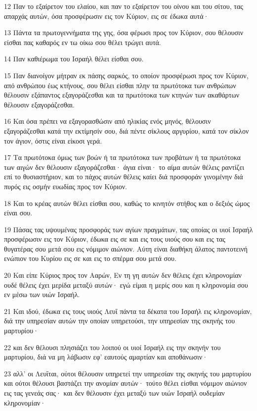 \par 12 Παν το εξαίρετον του ελαίου, και παν το εξαίρετον του οίνου και του σίτου, τας απαρχάς αυτών, όσα προσφέρωσιν εις τον Κύριον, εις σε έδωκα αυτά·
\par 13 Πάντα τα πρωτογεννήματα της γης, όσα φέρωσι προς τον Κύριον, σου θέλουσιν είσθαι πας καθαρός εν τω οίκω σου θέλει τρώγει αυτά.
\par 14 Παν καθιέρωμα του Ισραήλ θέλει είσθαι σου.
\par 15 Παν διανοίγον μήτραν εκ πάσης σαρκός, το οποίον προσφέρωσι προς τον Κύριον, από ανθρώπου έως κτήνους, σου θέλει είσθαι πλην τα πρωτότοκα των ανθρώπων θέλουσιν εξάπαντος εξαγοράζεσθαι και τα πρωτότοκα των κτηνών των ακαθάρτων θέλουσιν εξαγοράζεσθαι.
\par 16 Και όσα πρέπει να εξαγορασθώσιν από ηλικίας ενός μηνός, θέλουσιν εξαγοράζεσθαι κατά την εκτίμησίν σου, διά πέντε σίκλους αργυρίου, κατά τον σίκλον τον άγιον, όστις είναι είκοσι γερά.
\par 17 Τα πρωτότοκα όμως των βοών ή τα πρωτότοκα των προβάτων ή τα πρωτότοκα των αιγών δεν θέλουσιν εξαγοράζεσθαι· άγια είναι· το αίμα αυτών θέλεις ραντίζει επί το θυσιαστήριον, και το πάχος αυτών θέλεις καίει διά προσφοράν γινομένην διά πυρός εις οσμήν ευωδίας προς τον Κύριον.
\par 18 Και το κρέας αυτών θέλει είσθαι σου, καθώς το κινητόν στήθος και ο δεξιός ώμος είναι σου.
\par 19 Πάσας τας υψουμένας προσφοράς των αγίων πραγμάτων, τας οποίας οι υιοί Ισραήλ προσφέρωσιν εις τον Κύριον, έδωκα εις σε και εις τους υιούς σου και εις τας θυγατέρας σου μετά σου εις νόμιμον αιώνιον. Αύτη είναι διαθήκη άλατος παντοτεινή ενώπιον του Κυρίου εις σε και εις το σπέρμα σου μετά σου.
\par 20 Και είπε Κύριος προς τον Ααρών, Εν τη γη αυτών δεν θέλεις έχει κληρονομίαν ουδέ θέλεις έχει μερίδα μεταξύ αυτών· εγώ είμαι η μερίς σου και η κληρονομία σου εν μέσω των υιών Ισραήλ.
\par 21 Και ιδού, έδωκα εις τους υιούς Λευΐ πάντα τα δέκατα του Ισραήλ εις κληρονομίαν, διά την υπηρεσίαν αυτών την οποίαν υπηρετούσι, την υπηρεσίαν της σκηνής του μαρτυρίου·
\par 22 και δεν θέλουσι πλησιάζει του λοιπού οι υιοί Ισραήλ εις την σκηνήν του μαρτυρίου, διά να μη λάβωσιν εφ' εαυτούς αμαρτίαν και αποθάνωσιν·
\par 23 αλλ' οι Λευΐται, ούτοι θέλουσιν υπηρετεί την υπηρεσίαν της σκηνής του μαρτυρίου και ούτοι θέλουσι βαστάζει την ανομίαν αυτών· τούτο θέλει είσθαι νόμιμον αιώνιον εις τας γενεάς σας· και δεν θέλουσιν έχει μεταξύ των υιών Ισραήλ ουδεμίαν κληρονομίαν·
